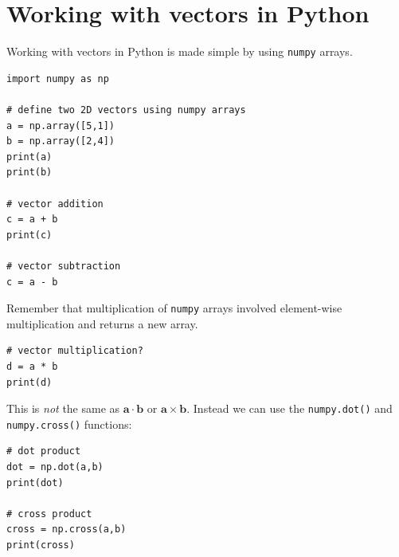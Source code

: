\documentclass[a4paper]{article}
\renewcommand{\vec}[1]{\mathbf{#1}}
\begin{document}
\section{Working with vectors in Python}
Working with vectors in Python is made simple by using \texttt{numpy} arrays.
\begin{lstlisting}
import numpy as np

# define two 2D vectors using numpy arrays
a = np.array([5,1])
b = np.array([2,4])
print(a)
print(b)

# vector addition
c = a + b
print(c)

# vector subtraction
c = a - b
\end{lstlisting}
Remember that multiplication of \texttt{numpy} arrays involved element-wise multiplication and returns a new array.
\begin{lstlisting}
# vector multiplication?
d = a * b
print(d)
\end{lstlisting}
This is \emph{not} the same as $\vec{a}\cdot\vec{b}$ or $\vec{a}\times\vec{b}$. Instead we can use the \texttt{numpy.dot()} and \texttt{numpy.cross()} functions:
\begin{lstlisting}
# dot product
dot = np.dot(a,b)
print(dot)

# cross product
cross = np.cross(a,b)
print(cross)
\end{lstlisting}

\vspace{\baselineskip}
\begin{center}
  \noindent{}
\end{center}


%
%
\end{document}

